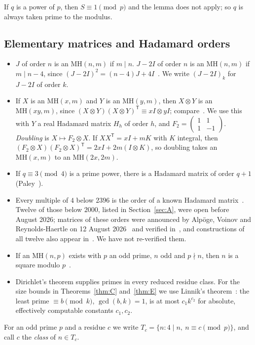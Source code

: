 \documentclass[10pt]{article}
\theoremstyle{remark}
\newcommand{\MH}{\mathrm{MH}}
\newcommand{\tr}{^{\mathsf T}}
\begin{document}
If $q$ is a power of $p$, then $S\equiv1\pmod p$ and the lemma does not apply; so $q$ is always taken prime to the modulus.

\subsection{Elementary matrices and Hadamard orders}
\begin{itemize}
\item $J$ of order $n$ is an $\MH(n,m)$ if $m\mid n$. $J-2I$ of order $n$ is an $\MH(n,m)$ if $m\mid n-4$, since $(J-2I)^2=(n-4)J+4I$~\cite[Lemma~2.3]{K}. We write $(J-2I)_k$ for $J-2I$ of order $k$.
\item If $X$ is an $\MH(x,m)$ and $Y$ is an $\MH(y,m)$, then $X\otimes Y$ is an $\MH(xy,m)$, since $(X\otimes Y)(X\otimes Y)\tr\equiv xI\otimes yI$; compare~\cite[Lemma~2.4]{K}. We use this with $Y$ a real Hadamard matrix $H_h$ of order $h$, and $F_2=\left(\begin{smallmatrix}1&1\\1&-1\end{smallmatrix}\right)$. \emph{Doubling} is $X\mapsto F_2\otimes X$. If $XX\tr=xI+mK$ with $K$ integral, then $(F_2\otimes X)(F_2\otimes X)\tr=2xI+2m(I\otimes K)$, so doubling takes an $\MH(x,m)$ to an $\MH(2x,2m)$.
\item If $q\equiv3\pmod4$ is a prime power, there is a Hadamard matrix of order $q+1$ (Paley~\cite{Pa33}).
\item Every multiple of $4$ below $2396$ is the order of a known Hadamard matrix~\cite[\S1 and Table~5]{EKLO}. Twelve of those below $2000$, listed in Section~\ref{sec:A}, were open before August 2026; matrices of these orders were announced by Alp\"oge, Voinov and Reynolds-Haertle on 12 August 2026~\cite{AVR26} and verified in~\cite[abstract and \S1]{EKLO}, and constructions of all twelve also appear in~\cite{HNW26}. We have not re-verified them.
\item If an $\MH(n,p)$ exists with $p$ an odd prime, $n$ odd and $p\nmid n$, then $n$ is a square modulo $p$~\cite[Lemma~2.2]{K}.
\item Dirichlet's theorem supplies primes in every reduced residue class. For the size bounds in Theorems~\ref{thm:C} and~\ref{thm:E} we use Linnik's theorem~\cite{Li44}: the least prime $\equiv b\pmod k$, $\gcd(b,k)=1$, is at most $c_1k^{c_2}$ for absolute, effectively computable constants $c_1,c_2$.
\end{itemize}
For an odd prime $p$ and a residue $c$ we write $T_c=\{n: 4\mid n,\ n\equiv c\pmod p\}$, and call $c$ the \emph{class} of $n\in T_c$.
\end{document}
